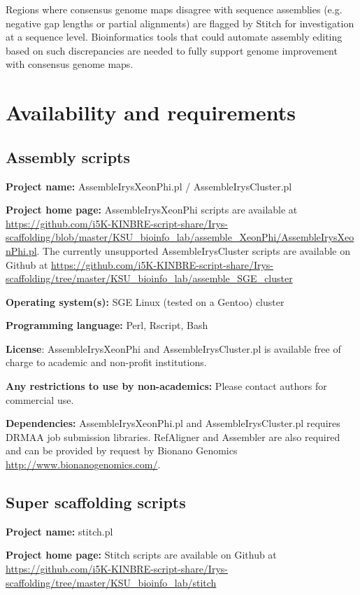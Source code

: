 \documentclass{bmcart}
\begin{document}
Regions where consensus genome maps disagree with sequence assemblies (e.g. negative gap lengths or partial alignments) are flagged by Stitch for investigation at a sequence level. Bioinformatics tools that could automate assembly editing based on such discrepancies are needed to fully support genome improvement with consensus genome maps. 

\section*{Availability and requirements}

\subsection*{\textbf{Assembly scripts}}

\textbf{Project name:} AssembleIrysXeonPhi.pl / AssembleIrysCluster.pl

\textbf{Project home page:} AssembleIrysXeonPhi scripts are available at \url{https://github.com/i5K-KINBRE-script-share/Irys-scaffolding/blob/master/KSU\_bioinfo\_lab/assemble\_XeonPhi/AssembleIrysXeonPhi.pl}. The currently unsupported AssembleIrysCluster scripts are available on Github at \url{https://github.com/i5K-KINBRE-script-share/Irys-scaffolding/tree/master/KSU\_bioinfo\_lab/assemble\_SGE\_cluster}

\textbf{Operating system(s):} SGE Linux (tested on a Gentoo) cluster

\textbf{Programming language:} Perl, Rscript, Bash

\textbf{License}: AssembleIrysXeonPhi and AssembleIrysCluster.pl is available free of charge to academic and non-profit institutions.

\textbf{Any restrictions to use by non-academics:} Please contact authors for commercial use.

\textbf{Dependencies:} AssembleIrysXeonPhi.pl and AssembleIrysCluster.pl requires DRMAA job submission libraries. RefAligner and Assembler are also required and can be provided by request by Bionano Genomics \url{http://www.bionanogenomics.com/}.

\subsection*{\textbf{Super scaffolding scripts}}

\textbf{Project name:} stitch.pl

\textbf{Project home page:} Stitch scripts are available on Github at \url{https://github.com/i5K-KINBRE-script-share/Irys-scaffolding/tree/master/KSU\_bioinfo\_lab/stitch}
\end{document}
